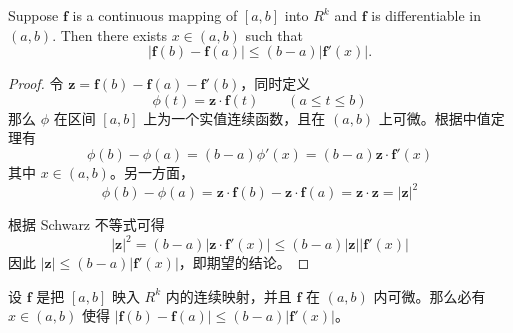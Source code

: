 \documentclass[../poma-notes.tex]{subfiles}
\begin{document}
\begin{theorem}
  Suppose $\mathbf{f}$ is a continuous mapping of $[a, b]$ into $R^k$ and $\mathbf{f}$ is differentiable in $(a, b)$. Then
  there exists $x \in (a, b)$ such that
  \[
    |\mathbf{f}(b) - \mathbf{f}(a)| \le (b - a) |\mathbf{f}'(x)|.
  \]
\end{theorem}

\begin{proof}
  令 $\mathbf{z} = \mathbf{f}(b) - \mathbf{f}(a) - \mathbf{f}'(b)$，同时定义
  \[
    \phi(t) = \mathbf{z} \cdot \mathbf{f}(t) \qquad (a \le t \le b)
  \]
  那么 $\phi$ 在区间 $[a, b]$ 上为一个实值连续函数，且在 $(a, b)$ 上可微。根据中值定理有
  \[
    \phi(b) - \phi(a) = (b - a) \phi'(x) = (b - a) \mathbf{z} \cdot \mathbf{f}'(x)
  \]
  其中 $x \in (a, b)$。另一方面，
  \[
    \phi(b) - \phi(a) = \mathbf{z} \cdot \mathbf{f}(b) - \mathbf{z} \cdot \mathbf{f}(a) = \mathbf{z} \cdot \mathbf{z} = |\mathbf{z}|^2
  \]

  根据 Schwarz 不等式可得
  \[
    |\mathbf{z}|^2 = (b-a) |\mathbf{z} \cdot \mathbf{f}'(x)| \le (b - a)|\mathbf{z}||\mathbf{f}'(x)|
  \]
  因此 $|\mathbf{z}| \le (b-a)|\mathbf{f}'(x)|$，即期望的结论。
\end{proof}

\begin{anote}
  设 $\mathbf{f}$ 是把 $[a, b]$ 映入 $R^k$ 内的连续映射，并且 $\mathbf{f}$ 在 $(a, b)$ 内可微。那么必有 $x \in (a,b)$ 使得
  $|\mathbf{f}(b) - \mathbf{f}(a)| \le (b-a)|\mathbf{f}'(x)|$。
\end{anote}
\end{document}
